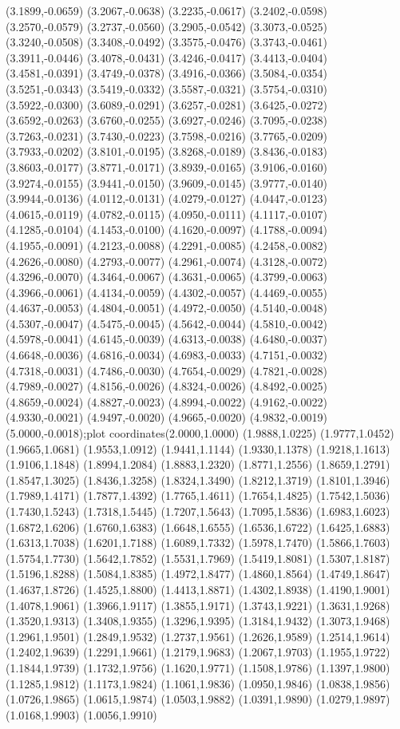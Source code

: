{(3.1899,-0.0659) (3.2067,-0.0638) (3.2235,-0.0617) (3.2402,-0.0598) (3.2570,-0.0579) (3.2737,-0.0560) (3.2905,-0.0542) (3.3073,-0.0525) (3.3240,-0.0508) (3.3408,-0.0492) (3.3575,-0.0476) (3.3743,-0.0461) (3.3911,-0.0446) (3.4078,-0.0431) (3.4246,-0.0417) (3.4413,-0.0404) (3.4581,-0.0391) (3.4749,-0.0378) (3.4916,-0.0366) (3.5084,-0.0354) (3.5251,-0.0343) (3.5419,-0.0332) (3.5587,-0.0321) (3.5754,-0.0310) (3.5922,-0.0300) (3.6089,-0.0291) (3.6257,-0.0281) (3.6425,-0.0272) (3.6592,-0.0263) (3.6760,-0.0255) (3.6927,-0.0246) (3.7095,-0.0238) (3.7263,-0.0231) (3.7430,-0.0223) (3.7598,-0.0216) (3.7765,-0.0209) (3.7933,-0.0202) (3.8101,-0.0195) (3.8268,-0.0189) (3.8436,-0.0183) (3.8603,-0.0177) (3.8771,-0.0171) (3.8939,-0.0165) (3.9106,-0.0160) (3.9274,-0.0155) (3.9441,-0.0150) (3.9609,-0.0145) (3.9777,-0.0140) (3.9944,-0.0136) (4.0112,-0.0131) (4.0279,-0.0127) (4.0447,-0.0123) (4.0615,-0.0119) (4.0782,-0.0115) (4.0950,-0.0111) (4.1117,-0.0107) (4.1285,-0.0104) (4.1453,-0.0100) (4.1620,-0.0097) (4.1788,-0.0094) (4.1955,-0.0091) (4.2123,-0.0088) (4.2291,-0.0085) (4.2458,-0.0082) (4.2626,-0.0080) (4.2793,-0.0077) (4.2961,-0.0074) (4.3128,-0.0072) (4.3296,-0.0070) (4.3464,-0.0067) (4.3631,-0.0065) (4.3799,-0.0063) (4.3966,-0.0061) (4.4134,-0.0059) (4.4302,-0.0057) (4.4469,-0.0055) (4.4637,-0.0053) (4.4804,-0.0051) (4.4972,-0.0050) (4.5140,-0.0048) (4.5307,-0.0047) (4.5475,-0.0045) (4.5642,-0.0044) (4.5810,-0.0042) (4.5978,-0.0041) (4.6145,-0.0039) (4.6313,-0.0038) (4.6480,-0.0037) (4.6648,-0.0036) (4.6816,-0.0034) (4.6983,-0.0033) (4.7151,-0.0032) (4.7318,-0.0031) (4.7486,-0.0030) (4.7654,-0.0029) (4.7821,-0.0028) (4.7989,-0.0027) (4.8156,-0.0026) (4.8324,-0.0026) (4.8492,-0.0025) (4.8659,-0.0024) (4.8827,-0.0023) (4.8994,-0.0022) (4.9162,-0.0022) (4.9330,-0.0021) (4.9497,-0.0020) (4.9665,-0.0020) (4.9832,-0.0019) (5.0000,-0.0018)};plot coordinates{(2.0000,1.0000) (1.9888,1.0225) (1.9777,1.0452) (1.9665,1.0681) (1.9553,1.0912) (1.9441,1.1144) (1.9330,1.1378) (1.9218,1.1613) (1.9106,1.1848) (1.8994,1.2084) (1.8883,1.2320) (1.8771,1.2556) (1.8659,1.2791) (1.8547,1.3025) (1.8436,1.3258) (1.8324,1.3490) (1.8212,1.3719) (1.8101,1.3946) (1.7989,1.4171) (1.7877,1.4392) (1.7765,1.4611) (1.7654,1.4825) (1.7542,1.5036) (1.7430,1.5243) (1.7318,1.5445) (1.7207,1.5643) (1.7095,1.5836) (1.6983,1.6023) (1.6872,1.6206) (1.6760,1.6383) (1.6648,1.6555) (1.6536,1.6722) (1.6425,1.6883) (1.6313,1.7038) (1.6201,1.7188) (1.6089,1.7332) (1.5978,1.7470) (1.5866,1.7603) (1.5754,1.7730) (1.5642,1.7852) (1.5531,1.7969) (1.5419,1.8081) (1.5307,1.8187) (1.5196,1.8288) (1.5084,1.8385) (1.4972,1.8477) (1.4860,1.8564) (1.4749,1.8647) (1.4637,1.8726) (1.4525,1.8800) (1.4413,1.8871) (1.4302,1.8938) (1.4190,1.9001) (1.4078,1.9061) (1.3966,1.9117) (1.3855,1.9171) (1.3743,1.9221) (1.3631,1.9268) (1.3520,1.9313) (1.3408,1.9355) (1.3296,1.9395) (1.3184,1.9432) (1.3073,1.9468) (1.2961,1.9501) (1.2849,1.9532) (1.2737,1.9561) (1.2626,1.9589) (1.2514,1.9614) (1.2402,1.9639) (1.2291,1.9661) (1.2179,1.9683) (1.2067,1.9703) (1.1955,1.9722) (1.1844,1.9739) (1.1732,1.9756) (1.1620,1.9771) (1.1508,1.9786) (1.1397,1.9800) (1.1285,1.9812) (1.1173,1.9824) (1.1061,1.9836) (1.0950,1.9846) (1.0838,1.9856) (1.0726,1.9865) (1.0615,1.9874) (1.0503,1.9882) (1.0391,1.9890) (1.0279,1.9897) (1.0168,1.9903) (1.0056,1.9910) }

